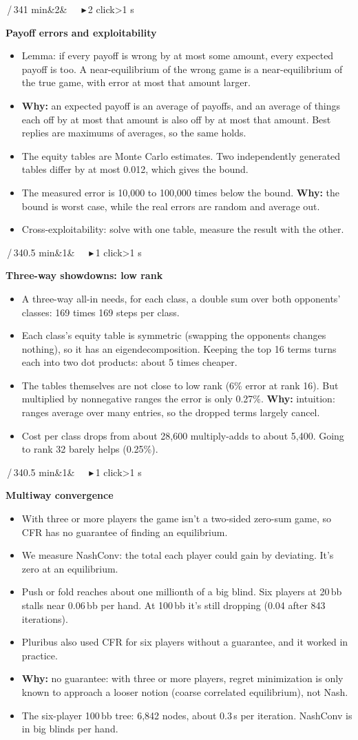 \documentclass{article}
\newcommand{\slide}[4]{\clearpage
  \noindent\colorbox{bar}{\parbox{\dimexpr\linewidth-2\fboxsep}{\color{white}\fontsize{13}{15}\selectfont
  \textbf{\fontsize{21}{23}\selectfont #1}\,/\,34\hfill #3\ifx&#4&\else\ \ \ \textcolor{ck!40!white}{\ensuremath{\blacktriangleright}}\,#4 click\ifnum#4>1 s\fi\fi\\[2pt]
  \raggedright\textbf{\fontsize{15}{17.5}\selectfont #2}}}\par\vspace{5pt}
  \fontsize{15}{17.8}\selectfont\raggedright}
\newcommand{\pt}{\item[\textbullet]}
\newcommand{\ck}{\item[\textcolor{ck}{\ensuremath{\blacktriangleright}}]}
\newcommand{\why}{\textcolor{why}{\textbf{Why:}} }
\begin{document}
\slide{28}{Payoff errors and exploitability}{1 min}{2}
\begin{itemize}
\pt Lemma: if every payoff is wrong by at most some amount, every expected payoff is too. A near-equilibrium of the wrong game is a near-equilibrium of the true game, with error at most that amount larger.
\ck \why an expected payoff is an average of payoffs, and an average of things each off by at most that amount is also off by at most that amount. Best replies are maximums of averages, so the same holds.
\ck The equity tables are Monte Carlo estimates. Two independently generated tables differ by at most 0.012, which gives the bound.
\pt The measured error is 10,000 to 100,000 times below the bound. \why the bound is worst case, while the real errors are random and average out.
\pt Cross-exploitability: solve with one table, measure the result with the other.
\end{itemize}

\slide{29}{Three-way showdowns: low rank}{0.5 min}{1}
\begin{itemize}
\pt A three-way all-in needs, for each class, a double sum over both opponents' classes: 169 times 169 steps per class.
\pt Each class's equity table is symmetric (swapping the opponents changes nothing), so it has an eigendecomposition. Keeping the top 16 terms turns each into two dot products: about 5 times cheaper.
\ck The tables themselves are not close to low rank (6\% error at rank 16). But multiplied by nonnegative ranges the error is only 0.27\%. \why intuition: ranges average over many entries, so the dropped terms largely cancel.
\pt Cost per class drops from about 28,600 multiply-adds to about 5,400. Going to rank 32 barely helps (0.25\%).
\end{itemize}

\slide{30}{Multiway convergence}{0.5 min}{1}
\begin{itemize}
\pt With three or more players the game isn't a two-sided zero-sum game, so CFR has no guarantee of finding an equilibrium.
\pt We measure NashConv: the total each player could gain by deviating. It's zero at an equilibrium.
\ck Push or fold reaches about one millionth of a big blind. Six players at 20\,bb stalls near 0.06\,bb per hand. At 100\,bb it's still dropping (0.04 after 843 iterations).
\pt Pluribus also used CFR for six players without a guarantee, and it worked in practice.
\pt \why no guarantee: with three or more players, regret minimization is only known to approach a looser notion (coarse correlated equilibrium), not Nash.
\pt The six-player 100\,bb tree: 6,842 nodes, about 0.3\,s per iteration. NashConv is in big blinds per hand.
\end{itemize}
\end{document}
